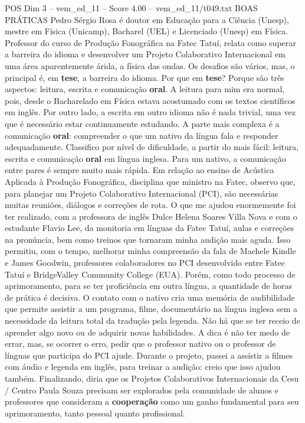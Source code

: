 \begin{textsample}{POS Dim 3 – vem\_ed\_11 – Score 4.00 – vem\_ed\_11/t049.txt}  \label{ex:f3_pos_139}
BOAS PRÁTICAS Pedro Sérgio Rosa é doutor em Educação para a Ciência (Unesp), mestre em Física (Unicamp), Bacharel (UEL) e Licenciado (Unesp) em Física.
Professor do curso de Produção Fonográfica na Fatec Tatuí, relata como superar a barreira do idioma e desenvolver um Projeto Colaborativo Internacional em uma área aparentemente árida, a física das ondas.
Os desafios são vários, mas, o principal é, em \textbf{tese}, a barreira do idioma.
Por que em \textbf{tese}?
Porque são três aspectos: leitura, escrita e comunicação \textbf{oral}.
A leitura para mim era normal, pois, desde o Bacharelado em Física estava acostumado com os textos científicos em inglês.
Por outro lado, a escrita em outro idioma não é nada trivial, uma vez que é necessário estar continuamente estudando.
A parte mais complexa é a comunicação \textbf{oral}: compreender o que um nativo da língua fala e responder adequadamente.
Classifico por nível de dificuldade, a partir do mais fácil: leitura, escrita e comunicação \textbf{oral} em língua inglesa.
Para um nativo, a comunicação entre pares é sempre muito mais rápida.
Em relação ao ensino de Acústica Aplicada à Produção Fonográfica, disciplina que ministro na Fatec, observo que, para planejar um Projeto Colaborativo Internacional (PCI), são necessárias muitas reuniões, diálogos e correções de rota.
O que me ajudou enormemente foi ter realizado, com a professora de inglês Dulce Helena Soares Villa Nova e com o estudante Flavio Lee, da monitoria em línguas da Fatec Tatuí, aulas e correções na pronúncia, bem como treinos que tornaram minha audição mais aguda.
Isso permitiu, com o tempo, melhorar minha compreensão da fala de Machele Kindle e James Goodwin, professores colaboradores no PCI desenvolvido entre Fatec Tatuí e BridgeValley Community College (EUA).
Porém, como todo processo de aprimoramento, para se ter proficiência em outra língua, a quantidade de horas de prática é decisiva.
O contato com o nativo cria uma memória de audibilidade que permite assistir a um programa, filme, documentário na língua inglesa sem a necessidade da leitura total da tradução pela legenda.
Não há que se ter receio de aprender algo novo ou de adquirir novas habilidades.
A dica é não ter medo de errar, mas, se ocorrer o erro, pedir que o professor nativo ou o professor de línguas que participa do PCI ajude.
Durante o projeto, passei a assistir a filmes com áudio e legenda em inglês, para treinar a audição: creio que isso ajudou também.
Finalizando, diria que os Projetos Colaborativos Internacionais da Cesu / Centro Paula Souza precisam ser explorados pela comunidade de alunos e professores que consideram a \textbf{cooperação} como um ganho fundamental para seu aprimoramento, tanto pessoal quanto profissional.

\end{textsample}
